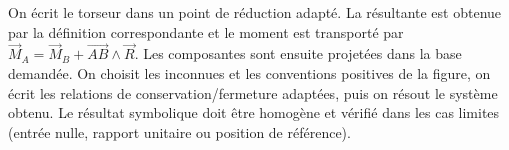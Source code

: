 \begin{corrigebox}
On écrit le torseur dans un point de réduction adapté. La résultante
        est obtenue par la définition correspondante et le moment est transporté par
        $\vec M_A=\vec M_B+\overrightarrow{AB}\wedge\vec R$. Les composantes sont ensuite
        projetées dans la base demandée.
On choisit les inconnues et les conventions positives de la figure,
        on écrit les relations de conservation/fermeture adaptées, puis on résout le
        système obtenu. Le résultat symbolique doit être homogène et vérifié dans les cas
        limites (entrée nulle, rapport unitaire ou position de référence).
\end{corrigebox}
